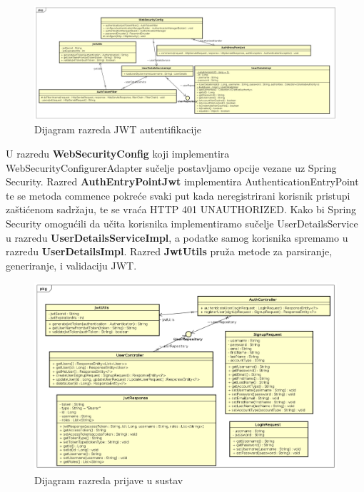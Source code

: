		\begin{landscape}
			\thispagestyle{empty}

			\begin{figure}[ht!]
				\centering
				\includegraphics[scale=0.50]{dijagrami/dijagram_razreda_JWT_security.png}
				\caption{Dijagram razreda JWT autentifikacije}
			\end{figure}
			
		\end{landscape}
		\restoregeometry
		\eject
		
		U razredu \textbf{WebSecurityConfig} koji implementira WebSecurityConfigurerAdapter sučelje postavljamo opcije vezane uz Spring Security. Razred \textbf{AuthEntryPointJwt} implementira AuthenticationEntryPoint te se metoda commence pokreće svaki put kada neregistrirani korisnik pristupi zaštićenom sadržaju, te se vraća HTTP 401 UNAUTHORIZED. Kako bi Spring Security omogućili da učita korisnika implementiramo sučelje UserDetailsService u razredu \textbf{UserDetailsServiceImpl}, a podatke samog korisnika spremamo u razredu \textbf{UserDetailsImpl}. Razred \textbf{JwtUtils} pruža metode za parsiranje, generiranje, i validaciju JWT.
		
		\begin{figure}[H]
			\includegraphics[width=\textwidth]{dijagrami/dijagram_razreda_login.png}
			\caption{Dijagram razreda prijave u sustav}
		\end{figure}
	
